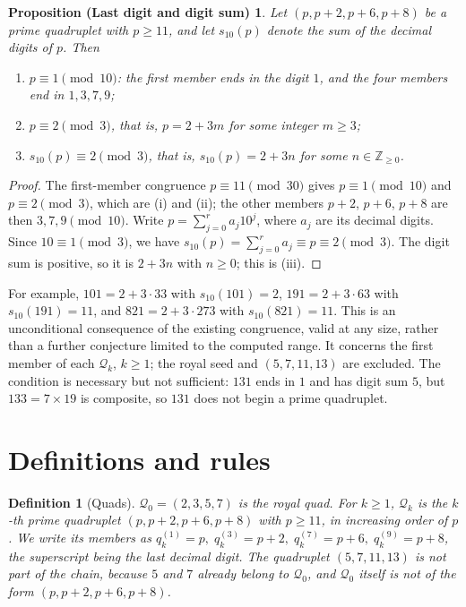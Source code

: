 \documentclass[11pt,a4paper]{article}
\newtheorem{definition}{Definition}
\newtheorem*{digitsumproposition}{Proposition (Last digit and digit sum)}
\newcommand{\Q}{\mathcal{Q}}
\begin{document}
\begin{digitsumproposition}
Let $(p,p+2,p+6,p+8)$ be a prime quadruplet with $p\ge11$, and let
$s_{10}(p)$ denote the sum of the decimal digits of $p$. Then
\begin{enumerate}
\item[(i)] $p\equiv1\pmod{10}$: the first member ends in the digit $1$,
  and the four members end in $1,3,7,9$;
\item[(ii)] $p\equiv2\pmod3$, that is, $p=2+3m$ for some integer $m\ge3$;
\item[(iii)] $s_{10}(p)\equiv2\pmod3$, that is, $s_{10}(p)=2+3n$ for some
  $n\in\mathbb Z_{\ge0}$.
\end{enumerate}
\end{digitsumproposition}
\begin{proof}
The first-member congruence $p\equiv11\pmod{30}$ gives $p\equiv1\pmod{10}$
and $p\equiv2\pmod3$, which are (i) and (ii); the other members
$p+2$, $p+6$, $p+8$ are then $3,7,9\pmod{10}$.
Write $p=\sum_{j=0}^{r}a_j10^j$, where $a_j$ are its decimal digits.
Since $10\equiv1\pmod3$, we have
$s_{10}(p)=\sum_{j=0}^{r}a_j\equiv p\equiv2\pmod3$.
The digit sum is positive, so it is $2+3n$ with $n\ge0$; this is (iii).
\end{proof}
For example, $101=2+3\cdot33$ with $s_{10}(101)=2$, $191=2+3\cdot63$ with
$s_{10}(191)=11$, and $821=2+3\cdot273$ with $s_{10}(821)=11$.
This is an unconditional consequence of the existing congruence, valid at
any size, rather than a further conjecture limited to the computed range.
It concerns the first member of each $\Q_k$, $k\ge1$; the royal seed and
$(5,7,11,13)$ are excluded. The condition is necessary but not sufficient:
$131$ ends in $1$ and has digit sum $5$, but $133=7\times19$ is composite,
so $131$ does not begin a prime quadruplet.

\section{Definitions and rules}
\label{sec:defs}

\begin{definition}[Quads]
$\Q_0=(2,3,5,7)$ is the \emph{royal quad}. For $k\ge 1$, $\Q_k$ is the
$k$-th prime quadruplet $(p,p+2,p+6,p+8)$ with $p\ge 11$, in increasing
order of $p$. We write its members as
$q_k^{(1)}=p,\; q_k^{(3)}=p+2,\; q_k^{(7)}=p+6,\; q_k^{(9)}=p+8$, the
superscript being the last decimal digit. The quadruplet $(5,7,11,13)$ is
not part of the chain, because $5$ and $7$ already belong to $\Q_0$, and
$\Q_0$ itself is not of the form $(p,p+2,p+6,p+8)$.
\end{definition}
\end{document}
